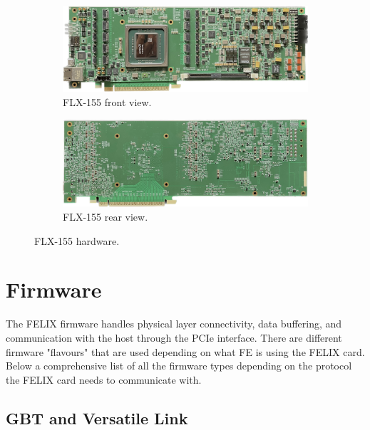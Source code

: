 \begin{figure}[H]
\centering
\begin{subfigure}[b]{0.7\textwidth}
    \centering
    \includegraphics[width=\textwidth]{images/felix/flx155_top.jpg}
    \caption{FLX-155 front view.}
    \label{fig:FLX-155-top}
\end{subfigure}

\vspace{0.2cm}

\begin{subfigure}[b]{0.7\textwidth}
    \centering
    \includegraphics[width=\textwidth]{images/felix/flx155_bot.jpg}
    \caption{FLX-155 rear view.}
    \label{fig:FLX-155-bot}
\end{subfigure}
\caption{FLX-155 hardware.}
\label{fig:FLX-155}
\end{figure}

\clearpage
\section{Firmware}
\label{sec:felix-firmware}

The \acs{FELIX} firmware handles physical layer connectivity, data buffering, and communication with the host through the \ac{PCIe} interface. There are different firmware "flavours" that are used depending on what \acl{FE} is using the \acs{FELIX} card.\\
Below a comprehensive list of all the firmware types depending on the protocol the \acs{FELIX} card needs to communicate with.

\subsection{\acl{GBT} and Versatile Link}
\label{subsec:felix-gbt}

